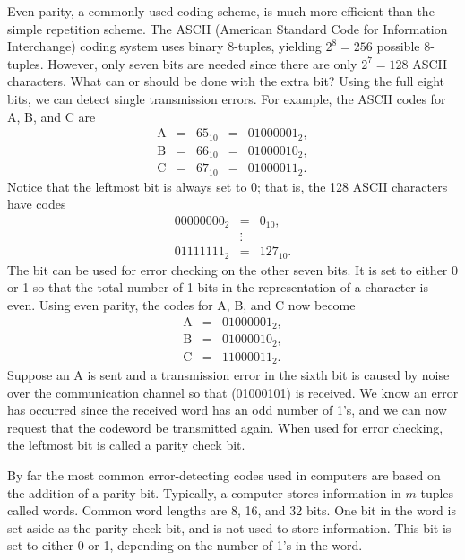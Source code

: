  
{\bfi Even parity}, a  commonly  used coding scheme, is much
more efficient than the simple repetition scheme. The ASCII (American
Standard Code for Information Interchange) coding system uses binary
8-tuples, yielding $2^{8} = 256$ possible 8-tuples. However, only seven
bits are needed since there are only $2^7 = 128$ ASCII characters.
What can or should be done with the extra bit? Using the full eight
bits, we can detect single transmission errors. For example, the ASCII
codes for A, B, and C are 
\[
\begin{array}{rcccl}
\mbox{A} & = & 65_{10} & = & 01000001_{2}, \\
\mbox{B} & = & 66_{10} & = & 01000010_{2}, \\
\mbox{C} & = & 67_{10} & = & 01000011_{2}.
\end{array}
\]
Notice that the leftmost bit is always set to 0; that is, the 128 ASCII
characters have codes 
\begin{eqnarray*}
00000000_{2} & = & 0_{10}, \\
& \vdots & \\
01111111_{2} & = & 127_{10}.
\end{eqnarray*}
The bit can be used for error checking on the other seven bits. It is
set to either 0 or 1 so that the total number of 1 bits in the
representation of a character is even. Using even parity, the codes
for A, B, and C now become 
\begin{eqnarray*}
\mbox{A} & = & 01000001_{2}, \\
\mbox{B} & = & 01000010_{2}, \\
\mbox{C} & = & 11000011_{2}.
\end{eqnarray*}
Suppose an A is sent and a transmission error in the sixth
bit is caused by noise over the communication channel so that 
(01000101) is received. We know an error has occurred since the
received word has an odd number of 1's, and we can now request that the
codeword be transmitted again. When used for error checking, the
leftmost bit is called a {\bfi parity check bit}.  
 
 
By far the most common error-detecting
codes used in computers are based on the addition of a parity bit.
Typically, a computer stores information in $m$-tuples called {\bfi
words}. Common word lengths are 8, 16, and 32 bits. One bit in the 
word is set aside as the parity check bit, and is not used to store
information. This bit is set to either 0 or 1, depending on the
number of 1's in the word. 
 
